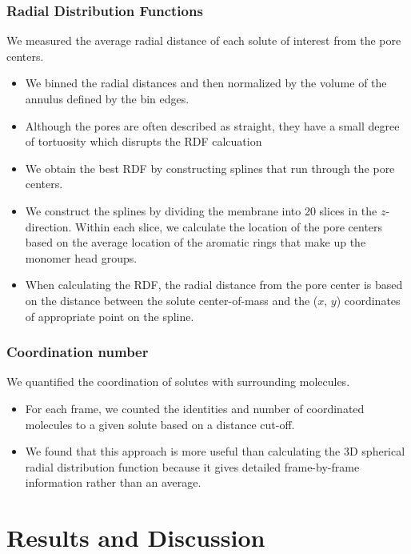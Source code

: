 \documentclass{article}
\begin{document}
  \subsubsection*{Radial Distribution Functions}

  We measured the average radial distance of each solute of interest from the pore
  centers.
  \begin{itemize}
	\item We binned the radial distances and then normalized by the volume
	of the annulus defined by the bin edges.
	\item Although the pores are often described as straight, they have a
	small degree of tortuosity which disrupts the RDF calcuation 
	\item We obtain the best RDF by constructing splines that run through the
	pore centers.
	\item We construct the splines by dividing the membrane into 20 slices
	in the $z$-direction. Within each slice, we calculate the location of 
	the pore centers based on the average location of the aromatic rings
	that make up the monomer head groups.
	\item When calculating the RDF, the radial distance from the pore center
	is based on the distance between the solute center-of-mass and the ($x$, $y$)
	coordinates of appropriate point on the spline.
  \end{itemize}

  \subsubsection*{Coordination number}

  We quantified the coordination of solutes with surrounding molecules.
  \begin{itemize}
  	\item For each frame, we counted the identities and number of
  	coordinated molecules to a given solute based on a distance cut-off. 
	\item We found that this approach is more useful than calculating the
	3D spherical radial distribution function because it gives detailed
	frame-by-frame information rather than an average. 
  \end{itemize}
   
  \section{Results and Discussion}
  
\end{document}
